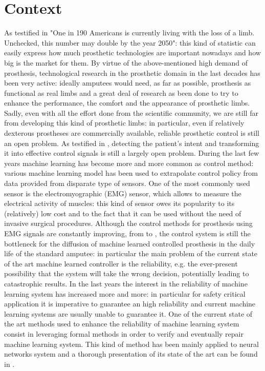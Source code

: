 \section{Context}\label{sec:context}
As testified in \cite{ZIEGLERGRAHAM2008422} "One in 190 Americans is currently living with the loss of a limb. Unchecked, this number may double by the year 2050": this kind of statistic can easily express how much prosthetic technologies are important nowadays and how big is the market for them.
By virtue of the above-mentioned high demand of prosthesis, technological research in the prosthetic domain in the last decades has been very active: ideally amputees would need, as far as possible, prosthesis as functional as real limbs and a great deal of research as been done to try to enhance the performance, the comfort and the appearance of prosthetic limbs. Sadly, even with all the effort done from the scientific community, we are still far from developing this kind of prosthetic limbs: in particular, even if relatively dexterous prostheses are commercially available, reliable prosthetic control is still an open problem. As testified in \cite{castellini2016upper}, detecting the patient's intent and transforming it into effective control signals is still a largely open problem. During the last few years machine learning has become more and more common as control method: various machine learning model has been used to extrapolate control policy from data provided from disparate type of sensors.
One of the most commonly used sensor is the electromyographic (EMG) sensor, which allows to measure the electrical activity of muscles: this kind of sensor owes its popularity to its (relatively) low cost and to the fact that it can be used without the need of invasive surgical procedures. Although the control methods for prosthesis using EMG signals are constantly improving, from \cite{Zecca2002} to \cite{Strazzulla2017}, the control system is still the bottleneck for the diffusion of machine learned controlled prosthesis in the daily life of the standard amputee: in particular the main problem of the current state of the art machine learned controller is the reliability, e.g. the ever-present possibility that the system will take the wrong decision, potentially leading to catastrophic results.
In the last years the interest in the reliability of machine learning system has increased more and more: in particular for safety critical application it is imperative to guarantee an high reliability and current machine learning systems are usually unable to guarantee it. One of the current state of the art methods used to enhance the reliability of machine learning system consist in leveraging formal methods in order to verify and eventually repair machine learning system. This kind of method has been mainly applied to neural networks system and a thorough presentation of its state of the art can be found in \cite{leofante2018automated}.